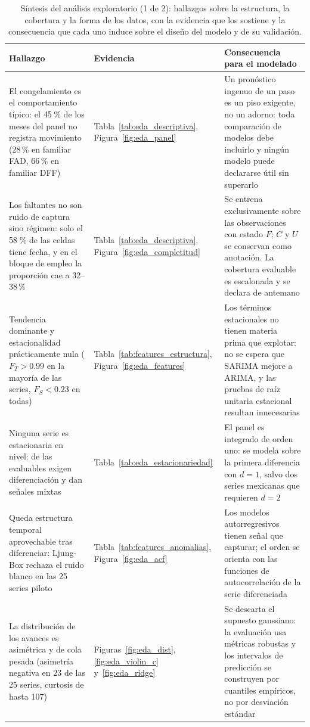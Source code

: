 \documentclass[12pt,letterpaper]{report}
\begin{document}
\begin{table}[H]
\centering
\footnotesize
\caption[Síntesis del análisis exploratorio (1 de 2)]{Síntesis del análisis exploratorio
(1 de 2): hallazgos sobre la estructura, la cobertura y la forma de los datos, con la
evidencia que los sostiene y la consecuencia que cada uno induce sobre el diseño del modelo
y de su validación.}
\label{tab:eda_sintesis}
\begin{tabular}{>{\raggedright\arraybackslash}p{3.8cm}>{\raggedright\arraybackslash}p{3.1cm}>{\raggedright\arraybackslash}p{6.5cm}}
\toprule
\rowcolor{uacjblue!15}
\textbf{Hallazgo} & \textbf{Evidencia} & \textbf{Consecuencia para el modelado} \\ \midrule
El congelamiento es el comportamiento típico: el $45$\,\% de los meses del panel
no registra movimiento (28\,\% en familiar FAD, 66\,\% en familiar DFF) &
Tabla~\ref{tab:eda_descriptiva}, Figura~\ref{fig:eda_panel} &
Un pronóstico ingenuo de un paso es un piso exigente, no un adorno: toda comparación de
modelos debe incluirlo y ningún modelo puede declararse útil sin superarlo \\
Los faltantes no son ruido de captura sino régimen: solo el $58$\,\% de las
celdas tiene fecha, y en el bloque de empleo la proporción cae a 32--38\,\% &
Tabla~\ref{tab:eda_descriptiva}, Figura~\ref{fig:eda_completitud} &
Se entrena exclusivamente sobre las observaciones con estado $F$; $C$ y $U$ se conservan como
anotación. La cobertura evaluable es escalonada y se declara de antemano \\
Tendencia dominante y estacionalidad prácticamente nula ($F_T>0.99$ en la mayoría de las
series, $F_S<0.23$ en todas) &
Tabla~\ref{tab:features_estructura}, Figura~\ref{fig:eda_features} &
Los términos estacionales no tienen materia prima que explotar: no se espera que SARIMA
mejore a ARIMA, y las pruebas de raíz unitaria estacional resultan innecesarias \\
Ninguna serie es estacionaria en nivel: \factStationarityDifference{} de las
\factNSeriesEvaluable{} evaluables exigen diferenciación y \factStationarityMixed{} dan señales
mixtas &
Tabla~\ref{tab:eda_estacionariedad} &
El panel es integrado de orden uno: se modela sobre la primera diferencia con $d=1$, salvo dos
series mexicanas que requieren $d=2$ \\
Queda estructura temporal aprovechable tras diferenciar: Ljung-Box rechaza el ruido blanco en
las 25 series piloto &
Tabla~\ref{tab:features_anomalias}, Figura~\ref{fig:eda_acf} &
Los modelos autorregresivos tienen señal que capturar; el orden se orienta con las funciones
de autocorrelación de la serie diferenciada \\
La distribución de los avances es asimétrica y de cola pesada (asimetría negativa en 23 de
las 25 series, curtosis de hasta 107) &
Figuras~\ref{fig:eda_dist}, \ref{fig:eda_violin_c} y~\ref{fig:eda_ridge} &
Se descarta el supuesto gaussiano: la evaluación usa métricas robustas y los intervalos de
predicción se construyen por cuantiles empíricos, no por desviación estándar \\
\bottomrule
\end{tabular}
\end{table}
\end{document}
